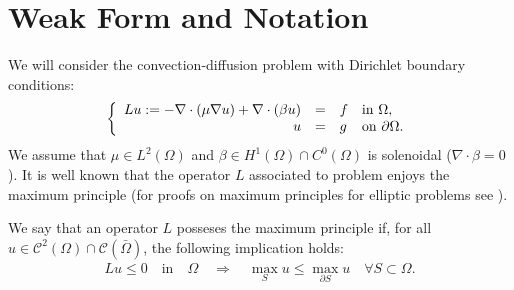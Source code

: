 \section{Weak Form and Notation}\label{s-contprob}


We will consider the convection-diffusion problem with Dirichlet boundary conditions:
\begin{equation}
\label{eq-strongform}
\left\{
\begin{array}{rcll}
Lu:=  - \nabla\cdot(\mu \nabla u) + \nabla\cdot(\beta u)  &=& f & \rm{in}\ \Omega, \\
u&=&g & \rm{on}\ \partial\Omega.\\
\end{array}\right.
\end{equation}
We assume that $\mu\in L^2(\Omega)$ and $\beta\in H^1(\Omega)\cap C^0(\Omega)$ is solenoidal ($\nabla \cdot \beta = 0$). It is well known that the operator $L$ associated to problem  enjoys the maximum principle (for proofs on maximum principles for elliptic problems see \cite{gilbarg2001elliptic}). 
\begin{definition}
We say that an operator $L$ posseses the maximum principle if, for all $u\in\mathcal{C}^2(\Omega)\cap\mathcal{C}(\bar{\Omega})$, the following implication holds:
\begin{align*}
Lu\leq 0 \quad \textrm{in}\quad \Omega  \quad \Longrightarrow   \quad \max_{{S}} u \leq \max_{\partial S} u\quad \forall S\subset \Omega.
\end{align*}
\end{definition}

